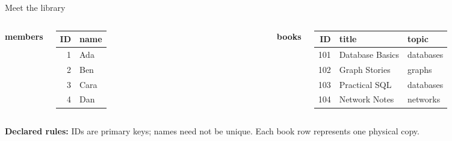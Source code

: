 \begin{frame}[t]{Meet the library}
\begin{columns}[T,onlytextwidth]
\textbf{members}\par\smallskip
\small\begin{tabular}{rl}\toprule ID & name\\\midrule
1 & Ada\\2 & Ben\\3 & Cara\\4 & Dan\\\bottomrule\end{tabular}
\textbf{books}\par\smallskip
\small\begin{tabular}{rll}\toprule ID & title & topic\\\midrule
101 & Database Basics & databases\\
102 & Graph Stories & graphs\\
103 & Practical SQL & databases\\
104 & Network Notes & networks\\\bottomrule\end{tabular}
\end{columns}\vspace{5mm}
\textbf{Declared rules:} IDs are primary keys; names need not be unique.
Each book row represents one physical copy.
\end{frame}
